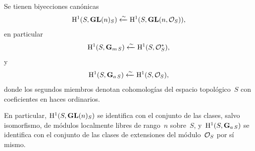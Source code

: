 \begin{corollaire}
\label{XI.5.3}
Se tienen biyecciones canónicas
$$
\H^1(S,\GL(n)_S)\isomfrom \H^1(S,\GL(n,\cal{O}_S))\quoi,
$$
en particular
$$
\H^1(S,\GG_{m\,S})\isomfrom \H^1(S,\cal{O}_S^*)\quoi,
$$
y
$$
\H^1(S,\GG_{a\,S})\isomfrom \H^1(S,\cal{O}_S)\quoi,
$$
donde los segundos miembros denotan cohomologías del espacio topológico~$S$
con coeficientes en haces ordinarios.
\end{corollaire}

En particular, $\H^1(S,\GL(n)_S)$ se identifica con el conjunto de las
clases, salvo isomorfismo, de módulos localmente libres de rango~$n$ sobre~$S$,
y~$\H^1(S,\GG_{a\,S})$ se identifica con el conjunto de las clases de
extensiones del módulo~$\cal{O}_S$ por sí mismo.
